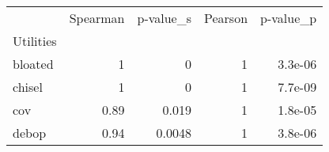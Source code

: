 \begin{tabular}{lrrrr}
\toprule
 & Spearman & p-value_s & Pearson & p-value_p \\
Utilities &  &  &  &  \\
\midrule
bloated & 1 & 0 & 1 & 3.3e-06 \\
chisel & 1 & 0 & 1 & 7.7e-09 \\
cov & 0.89 & 0.019 & 1 & 1.8e-05 \\
debop & 0.94 & 0.0048 & 1 & 3.8e-06 \\
\bottomrule
\end{tabular}

